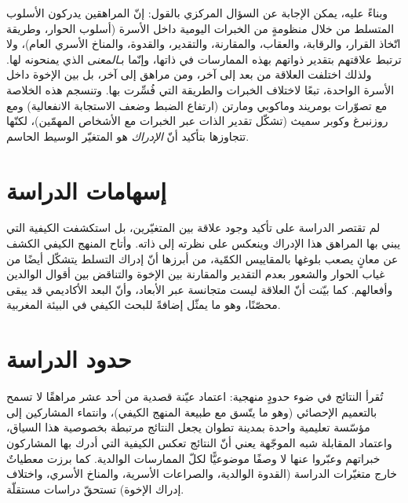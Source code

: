 وبناءً عليه، يمكن الإجابة عن السؤال المركزي بالقول: إنّ المراهقين يدركون الأسلوب المتسلط من خلال
منظومةٍ من الخبرات اليومية داخل الأسرة (أسلوب الحوار، وطريقة اتّخاذ القرار، والرقابة، والعقاب،
والمقارنة، والتقدير، والقدوة، والمناخ الأسري العام)، ولا ترتبط علاقتهم بتقدير ذواتهم بهذه
الممارسات في ذاتها، وإنّما بـ\emph{المعنى} الذي يمنحونه لها. ولذلك اختلفت العلاقة من بعد إلى آخر،
ومن مراهق إلى آخر، بل بين الإخوة داخل الأسرة الواحدة، تبعًا لاختلاف الخبرات والطريقة التي فُسِّرت
بها. وتنسجم هذه الخلاصة مع تصوّرات بومريند وماكوبي ومارتن (ارتفاع الضبط وضعف الاستجابة
الانفعالية) ومع روزنبرغ وكوبر سميث (تشكّل تقدير الذات عبر الخبرات مع الأشخاص المهمّين)، لكنّها
تتجاوزها بتأكيد أنّ \emph{الإدراك} هو المتغيّر الوسيط الحاسم.

\section{إسهامات الدراسة}
لم تقتصر الدراسة على تأكيد وجود علاقة بين المتغيّرين، بل استكشفت الكيفية التي يبني بها المراهق
هذا الإدراك وينعكس على نظرته إلى ذاته. وأتاح المنهج الكيفي الكشف عن معانٍ يصعب بلوغها بالمقاييس
الكمّية، من أبرزها أنّ إدراك التسلط يتشكّل أيضًا من غياب الحوار والشعور بعدم التقدير والمقارنة بين
الإخوة والتناقض بين أقوال الوالدين وأفعالهم. كما بيّنت أنّ العلاقة ليست متجانسة عبر الأبعاد، وأنّ
البعد الأكاديمي قد يبقى محصّنًا، وهو ما يمثّل إضافةً للبحث الكيفي في البيئة المغربية.

\section{حدود الدراسة}
تُقرأ النتائج في ضوء حدودٍ منهجية: اعتماد عيّنة قصدية من أحد عشر مراهقًا لا تسمح بالتعميم
الإحصائي (وهو ما يتّسق مع طبيعة المنهج الكيفي)، وانتماء المشاركين إلى مؤسّسة تعليمية واحدة بمدينة
تطوان يجعل النتائج مرتبطة بخصوصية هذا السياق، واعتماد المقابلة شبه الموجّهة يعني أنّ النتائج تعكس
الكيفية التي أدرك بها المشاركون خبراتهم وعبّروا عنها لا وصفًا موضوعيًّا لكلّ الممارسات الوالدية.
كما برزت معطياتٌ خارج متغيّرات الدراسة (القدوة الوالدية، والصراعات الأسرية، والمناخ الأسري،
واختلاف إدراك الإخوة) تستحقّ دراسات مستقلّة.

